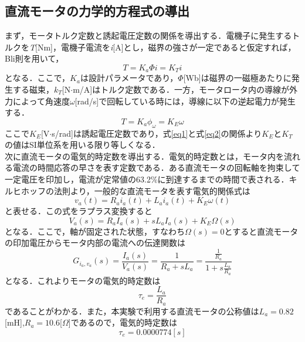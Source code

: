 \documentclass[11pt,a4paper]{jsarticle}
\begin{document}
  \subsection{直流モータの力学的方程式の導出}
  まず，モータトルク定数と誘起電圧定数の関係を導出する．電機子に発生するトルクを{\it T}[Nm]，電機子電流を{\it i}[A]とし，磁界の強さが一定であると仮定すれば，Bli則を用いて，
  \begin{equation}
   T = K_a \Phi i = K_T i
    \label{eq1}
  \end{equation}
  となる．ここで，$K_a$は設計パラメータであり，$\Phi$[Wb]は磁界の一磁極あたりに発生する磁束，$k_T$[N$\cdot$m/A]はトルク定数である．一方，モータロータ内の導線が外力によって角速度$\omega$[rad/s]で回転している時には，導線に以下の逆起電力が発生する．
  \begin{equation}
   T = K_a \phi_\omega = K_E \omega
    \label{eq2}
  \end{equation}
  ここで$K_E$[V$\cdot$s/rad]は誘起電圧定数であり，式\ref{eq1}と式\ref{eq2}の関係より$K_E$と$K_T$の値はSI単位系を用いる限り等しくなる．\\
  次に直流モータの電気的時定数を導出する．電気的時定数とは，モータ内を流れる電流の時間応答の早さを表す定数である．ある直流モータの回転軸を拘束して一定電圧を印加し，電流が定常値の63.2\%に到達するまでの時間で表される．キルヒホッフの法則より，一般的な直流モータを表す電気的関係式は
  \begin{equation}
   v_a (t) = R_a i_a (t) + L_a i_a (t) + K_E \omega (t)
    \label{eq3}
  \end{equation}
  と表せる．この式をラプラス変換すると
  \begin{equation}
   V_a (s) = R_a I_a (s) + sL_a I_a (s) + K_E \Omega (s)
    \label{eq4}\label{block1}
  \end{equation}
  となる．ここで，軸が固定された状態，すなわち$\Omega (s) = 0$とすると直流モータの印加電圧からモータ内部の電流への伝達関数は
  \begin{equation}
   G_{{i_a},{v_a}} (s) = \frac{I_a(s)}{V_a(s)} = \frac{1}{R_a + sL_a} = \frac{\frac{1}{R_a}}{1+s\frac{L_a}{R_a}}
    \label{eq5}
  \end{equation}
  となる．これよりモータの電気的時定数は
  \begin{equation}
   \tau_e  = \frac{L_a}{R_a}
    \label{eq6}
  \end{equation}
  であることがわかる．また，本実験で利用する直流モータの公称値は$L_a = 0.82$[mH],$R_a = 10.6$[$\Omega$]であるので，電気的時定数は
  \begin{equation}
   \tau_e = 0.0000774[s]
    \label{eq7}
  \end{equation}
\end{document}
